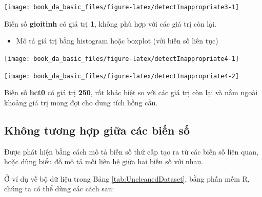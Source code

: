 \documentclass[]{tufte-book}
\newenvironment{Shaded}{}{}
\newcommand{\KeywordTok}[1]{\textcolor[rgb]{0.00,0.44,0.13}{\textbf{#1}}}
\newcommand{\NormalTok}[1]{#1}
\newcommand{\OperatorTok}[1]{\textcolor[rgb]{0.40,0.40,0.40}{#1}}
\providecommand{\tightlist}{%
  \setlength{\itemsep}{0pt}\setlength{\parskip}{0pt}}
\begin{document}
\begin{center}\texttt{[image: book\_da\_basic\_files/figure-latex/detectInappropriate3-1]} \end{center}

Biến số \textbf{gioitinh} có giá trị \textbf{1}, không phù hợp với các giá trị còn lại.

\begin{itemize}
\tightlist
\item
  Mô tả giá trị bằng histogram hoặc boxplot (với biến số liên tục)
\end{itemize}

\begin{Shaded}
\end{Shaded}

\begin{center}\texttt{[image: book\_da\_basic\_files/figure-latex/detectInappropriate4-1]} \end{center}

\begin{Shaded}
\end{Shaded}

\begin{center}\texttt{[image: book\_da\_basic\_files/figure-latex/detectInappropriate4-2]} \end{center}

Biến số \textbf{hct0} có giá trị \textbf{250}, rất khác biệt so với các giá trị còn lại và nằm ngoài khoảng giá trị mong đợi cho dung tích hồng cầu.

\hypertarget{khong-tuong-hp-gia-cac-bin-s}{%
\subsection{Không tương hợp giữa các biến số}\label{khong-tuong-hp-gia-cac-bin-s}}

Được phát hiện bằng cách mô tả biến số thứ cấp tạo ra từ các biến số liên quan, hoặc dùng biểu đồ mô tả mối liên hệ giữa hai biến số với nhau.

Ở ví dụ về bộ dữ liệu trong Bảng \ref{tab:UncleanedDataset}, bằng phần mềm R, chúng ta có thể dùng các cách sau:
\end{document}
